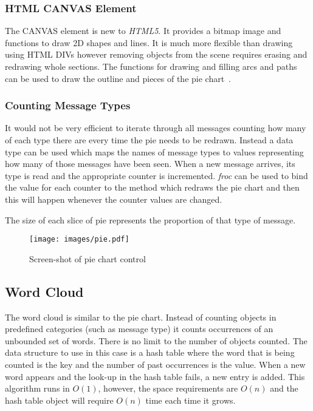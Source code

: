 \subsubsection{HTML CANVAS Element}
The CANVAS element is new to \emph{HTML5}. It provides a bitmap image and functions to draw 2D shapes and lines. It is much more flexible than drawing using HTML DIVs however removing objects from the scene requires erasing and redrawing whole sections. The functions for drawing and filling arcs and paths can be used to draw the outline and pieces of the pie chart~\cite{bib:html5}.

\subsubsection{Counting Message Types}
It would not be very efficient to iterate through all messages counting how many of each type there are every time the pie needs to be redrawn. Instead a data type can be used which maps the names of message types to values representing how many of those messages have been seen. When a new message arrives, its type is read and the appropriate counter is incremented. \emph{froc} can be used to bind the value for each counter to the method which redraws the pie chart and then this will happen whenever the counter values are changed.

The size of each slice of pie represents the proportion of that type of message.

\begin{figure}
  \centering
  \texttt{[image: images/pie.pdf]}
  \caption{Screen-shot of pie chart control}
  \label{fig:pie}
\end{figure}

\subsection{Word Cloud}
The word cloud is similar to the pie chart. Instead of counting objects in predefined categories (such as message type) it counts occurrences of an unbounded set of words. There is no limit to the number of objects counted. The data structure to use in this case is a hash table where the word that is being counted is the key and the number of past occurrences is the value. When a new word appears and the look-up in the hash table fails, a new entry is added. This algorithm runs in \texttt{$O(1)$}, however, the space requirements are \texttt{$O(n)$} and the hash table object will require \texttt{$O(n)$} time each time it grows.

